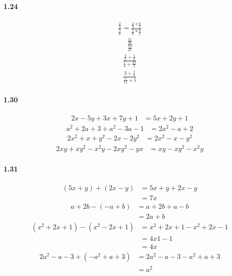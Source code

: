 \documentclass{article}
\begin{document}
\paragraph{1.24}
\begin{align*}
  \frac{\frac{2}{3}}{\frac{5}{6}} = \frac{\frac{2}{3} * \frac{6}{1}}{\frac{5}{6} * \frac{6}{1}}
\end{align*}
\begin{align*}
  \frac{\frac{21}{36}}{\frac{14}{45}}
\end{align*}
\begin{align*}
  \frac{\frac{3}{2} + \frac{5}{8}}{\frac{1}{4} + \frac{25}{2}}
\end{align*}
\begin{align*}
  \frac{3 + \frac{4}{3}}{\frac{5}{12} + 5}
\end{align*}



\paragraph{1.30}
\begin{align*}
  2x - 5y + 3x + 7y + 1 &= 5x + 2y + 1 
\end{align*}
\begin{align*}
  a^2 + 2a + 3 + a^2 - 3a -1 &= 2a^2 - a + 2
\end{align*}
\begin{align*}
  2x^2 + x + y^2 - 2x - 2y^2 &= 2x^2 - x - y^2
\end{align*}
\begin{align*}
  2xy + xy^2 - x^2y - 2xy^2 - yx &= xy - xy^2 - x^2y
\end{align*}

\paragraph{1.31}
\begin{align*}
  (5x + y) + (2x - y) &= 5x + y + 2x - y \\
  &= 7x 
\end{align*}
\begin{align*}
  a + 2b - (-a + b) &= a + 2b + a - b \\
  &= 2a + b
\end{align*}
\begin{align*}
  (x^2 + 2x + 1) - (x^2 - 2x + 1) &= x^2 + 2x + 1 - x^2 + 2x - 1 \\
  &= 4x 1 - 1 \\
  &= 4x
\end{align*}
\begin{align*}
  2a^2 - a - 3 + (-a^2 + a + 3) &= 2a^2 - a - 3 - a^2 + a + 3 \\
  &= a^2 
\end{align*}
\end{document}
